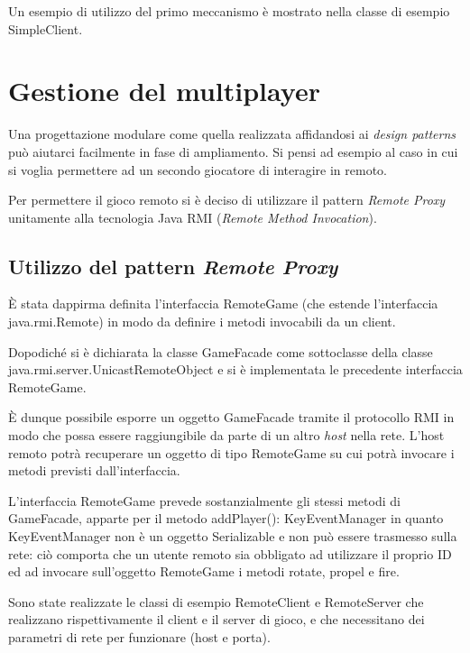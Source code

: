 \documentclass[a4paper,12pt]{article}
\begin{document}
Un esempio di utilizzo del primo meccanismo \`e mostrato nella classe di esempio \textsf{SimpleClient}.

\section{Gestione del multiplayer}
\label{sec:multiplayer}

Una progettazione modulare come quella realizzata affidandosi ai \emph{design patterns} pu\`o aiutarci facilmente in fase di ampliamento. Si pensi ad esempio al caso in cui si voglia permettere ad un secondo giocatore di interagire in remoto.

Per permettere il gioco remoto si \`e deciso di utilizzare il pattern \emph{Remote Proxy} unitamente alla tecnologia Java RMI (\emph{Remote Method Invocation}).

\subsection{Utilizzo del pattern \emph{Remote Proxy}}

\`E stata dappirma definita l'interfaccia \textsf{RemoteGame} (che estende l'interfaccia \textsf{java.rmi.Remote}) in modo da definire i metodi invocabili da un client.

Dopodich\'e si \`e dichiarata la classe  \textsf{GameFacade} come sottoclasse della classe  \textsf{java.rmi.server.UnicastRemoteObject} e si \`e implementata le precedente interfaccia
\textsf{RemoteGame}.

\`E dunque possibile esporre un oggetto \textsf{GameFacade} tramite il protocollo RMI in modo che possa essere raggiungibile da parte di un altro \emph{host} nella rete. L'host remoto potr\`a recuperare un oggetto di tipo \textsf{RemoteGame} su cui potr\`a invocare i metodi previsti dall'interfaccia.

L'interfaccia \textsf{RemoteGame} prevede sostanzialmente gli stessi metodi di \textsf{GameFacade}, apparte per il metodo \textsf{addPlayer(): KeyEventManager} in quanto \textsf{KeyEventManager} non \`e un oggetto \textsf{Serializable} e non pu\`o essere trasmesso sulla rete: ci\`o comporta che un utente remoto sia obbligato ad utilizzare il proprio ID ed ad invocare sull'oggetto \textsf{RemoteGame} i metodi \textsf{rotate}, \textsf{propel} e \textsf{fire}.

Sono state realizzate le classi di esempio \textsf{RemoteClient} e \textsf{RemoteServer} che realizzano rispettivamente il client e il server di gioco, e che necessitano dei parametri di rete per funzionare (host e porta).
\end{document}
